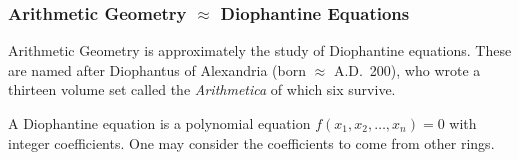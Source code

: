 
\begin{frame}[plain]
\end{frame}



\begin{frame}[plain] \frametitle{Arithmetic Geometry $\approx$ Diophantine Equations}
{\scriptsize Arithmetic Geometry is approximately the study of Diophantine equations. These are named after Diophantus of Alexandria (born $\approx$ A.D.~200), who wrote a thirteen volume set called the \textit{Arithmetica} of which six survive.}

\begin{dfn} \scriptsize
A Diophantine equation is a polynomial equation $f(x_1, x_2, \ldots, x_n)= 0$ with integer coefficients. One may consider the coefficients to come from other rings. 
\end{dfn}


\end{frame}
